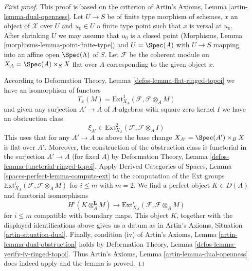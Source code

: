 \begin{proof}[First proof]
This proof is based on the criterion of
Artin's Axioms, Lemma \ref{artin-lemma-dual-openness}.
Let $U \to S$ be of finite type morphism of schemes, $x$ an object of
$\mathcal{X}$ over $U$ and $u_0 \in U$ a finite type point such that
$x$ is versal at $u_0$. After shrinking $U$ we may assume that $u_0$
is a closed point (Morphisms, Lemma \ref{morphisms-lemma-point-finite-type})
and $U = \Spec(A)$ with $U \to S$ mapping into an
affine open $\Spec(\Lambda)$ of $S$.
Let $\mathcal{F}$ be the coherent module on $X_A = \Spec(A) \times_S X$
flat over $A$ corresponding to the given object $x$.

\medskip\noindent
According to Deformation Theory, Lemma \ref{defos-lemma-flat-ringed-topoi}
we have an isomorphism of functors
$$
T_x(M) = \text{Ext}^1_{X_A}(\mathcal{F}, \mathcal{F} \otimes_A M)
$$
and given any surjection $A' \to A$ of $\Lambda$-algebras with square zero
kernel $I$ we have an obstruction class
$$
\xi_{A'} \in \text{Ext}^2_{X_A}(\mathcal{F}, \mathcal{F} \otimes_A I)
$$
This uses that for any $A' \to A$ as above the base change
$X_{A'} = \Spec(A') \times_B X$ is flat over $A'$.
Moreover, the construction of the obstruction class is functorial
in the surjection $A' \to A$ (for fixed $A$) by
Deformation Theory, Lemma \ref{defos-lemma-functorial-ringed-topoi}.
Apply Derived Categories of Spaces, Lemma
\ref{spaces-perfect-lemma-compute-ext}
to the computation of the Ext groups
$\text{Ext}^i_{X_A}(\mathcal{F}, \mathcal{F} \otimes_A M)$
for $i \leq m$ with $m = 2$. We find a perfect object $K \in D(A)$
and functorial isomorphisms
$$
H^i(K \otimes_A^\mathbf{L} M)
\longrightarrow
\text{Ext}^i_{X_A}(\mathcal{F}, \mathcal{F} \otimes_A M)
$$
for $i \leq m$ compatible with boundary maps. This object $K$, together
with the displayed identifications above gives us a datum as in
Artin's Axioms, Situation \ref{artin-situation-dual}.
Finally, condition (iv) of
Artin's Axioms, Lemma \ref{artin-lemma-dual-obstruction}
holds by 
Deformation Theory, Lemma \ref{defos-lemma-verify-iv-ringed-topoi}.
Thus Artin's Axioms, Lemma \ref{artin-lemma-dual-openness}
does indeed apply and the lemma is proved.
\end{proof}


